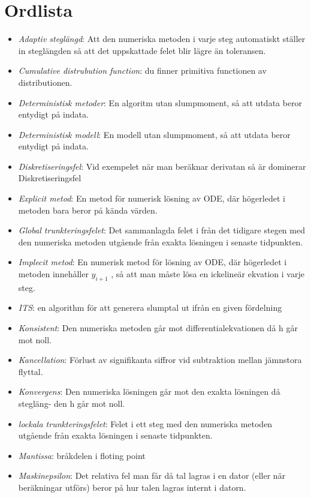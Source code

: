 \documentclass{article}
\begin{document}
\section{Ordlista}
\begin{itemize}
  \item \textit{Adaptiv steglängd}: Att den numeriska metoden i varje steg automatiskt ställer in
steglängden så att det uppskattade felet blir lägre än toleransen.
  \item \textit{Cumulative distrubution function}: du finner primitiva functionen av distributionen.
  \item \textit{Deterministisk metoder}: En algoritm utan slumpmoment, så att utdata beror entydigt på
indata.
  \item \textit{Deterministisk modell}: En modell utan slumpmoment, så att utdata beror entydigt på
indata.
  \item \textit{Diskretiseringsfel}: Vid exempelet när man beräknar derivatan så är
dominerar Diskretiseringsfel
  \item \textit{Explicit metod}: En metod för numerisk lösning av ODE, där högerledet i metoden
bara beror på kända värden.
  \item \textit{Global trunkteringsfelet}: Det sammanlagda felet i från det tidigare stegen med den numeriska metoden utgående från exakta
lösningen i senaste tidpunkten.
  \item \textit{Implecit metod}: En numerisk metod för lösning av ODE, där högerledet i metoden
innehåller $y_{i+1}$ , så att man måste lösa en ickelineär ekvation i varje
steg.
  \item \textit{ITS}: en algorithm för att generera slumptal ut ifrån en given fördelning
  \item \textit{Konsistent}: Den numeriska metoden går mot diﬀerentialekvationen då h går
mot noll.
 \item \textit{Kancellation}: Förlust av signifikanta siﬀror vid subtraktion mellan jämnstora
flyttal.
  \item \textit{Konvergens}: Den numeriska lösningen går mot den exakta lösningen då stegläng-
den h går mot noll.
  \item \textit{lockala trunkteringsfelet}: Felet i ett steg med den numeriska metoden utgående från exakta
lösningen i senaste tidpunkten.
  \item \textit{Mantissa}: bråkdelen i floting point
  \item \textit{Maskinepsilon}: Det relativa fel man får då tal lagras i en dator (eller när beräkningar utförs) beror på hur talen lagras internt i datorn.

\end{itemize}
\end{document}
